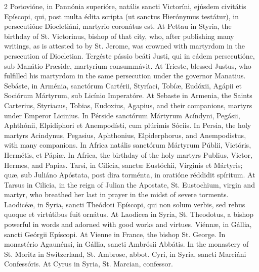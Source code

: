 \begin{paracol}{2}
Pœtovióne, in Pannónia 
 superióre, natális sancti Victoríni, ejúsdem civitátis Epíscopi, qui, post 
 multa édita scripta (ut sanctus Hierónymus testátur), in persecutióne 
 Diocletiáni, martyrio coronátus est.
\switchcolumn
{}
At Pettau in Styria, the birthday of 
 St. Victorinus, bishop of that city, who, after publishing many writings, as 
 is attested to by St. Jerome, was crowned with martyrdom in the persecution 
 of Diocletian.
\switchcolumn*
{}
Tergéste pássio beáti 
 Justi, qui in eádem persecutióne, sub Manátio Præside, martyrium consummávit.
\switchcolumn
{}
At Trieste, blessed Justus, who 
 fulfilled his martyrdom in the same persecution under the governor Manatius.
\switchcolumn*
{}
Sebáste, in Arménia, sanctórum Cartérii, Styríaci, Tobíæ, Eudóxii, Agápii et Sociórum Mártyrum, 
 sub Licínio Imperatóre.
\switchcolumn
{}
At Sebaste in Armenia, the Saints 
 Carterius, Styriacus, Tobias, Eudoxius, Agapius, and their companions, 
 martyrs under Emperor Licinius.
\switchcolumn*
{}
In Pérside sanctórum 
 Mártyrum Acíndyni, Pegásii, Aphthónii, Elpidíphori et Anempodísti, cum 
 plúrimis Sóciis.
\switchcolumn
{}
In Persia, the holy martyrs 
 Acindynus, Pegasius, Aphthonius, Elpiderphorus, and Anempodistus, with many 
 companions.
\switchcolumn*
{}
In Africa natális 
 sanctórum Mártyrum Públii, Victóris, Hermétis, et Pápiæ.
\switchcolumn
{}
In Africa, the birthday of the holy 
 martyrs Publius, Victor, Hermes, and Papias.
\switchcolumn*
{}
Tarsi, in Cilícia, 
 sanctæ Eustóchii, Vírginis et Mártyris; quæ, sub Juliáno Apóstata, post dira 
 torménta, in oratióne réddidit spíritum.
\switchcolumn
{}
At Tarsus in Cilicia, in the reign 
 of Julian the Apostate, St. Eustochium, virgin and martyr, who breathed her 
 last in prayer in the midst of severe torments.
\switchcolumn*
{}
Laodicéæ, in Syria, 
 sancti Theódoti Epíscopi, qui non solum verbis, sed rebus quoque et 
 virtútibus fuit ornátus.
\switchcolumn
{}
At Laodicea in Syria, St. Theodotus, 
 a bishop powerful in words and adorned with good works and virtues.
\switchcolumn*
{}
Viénnæ, in Gállia, 
 sancti Geórgii Epíscopi.
\switchcolumn
{}
At Vienne in France, the bishop St. 
 George.
\switchcolumn*
{}
In monastério Agaunénsi, 
 in Gállia, sancti Ambrósii Abbátis.
\switchcolumn
{}
In the monastery of St. Moritz in 
 Switzerland, St. Ambrose, abbot.
\switchcolumn*
{}
Cyri, in Syria, sancti 
 Marciáni Confessóris.
\switchcolumn
{}
At Cyrus in Syria, St. Marcian, 
 confessor.
\switchcolumn*


\end{paracol}
